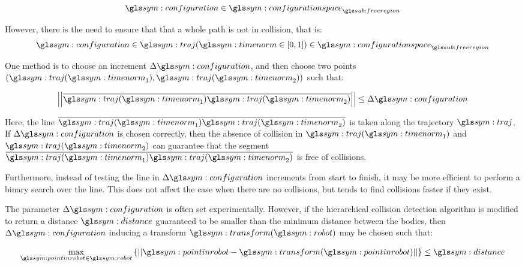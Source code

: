 				\begin{equation}
					\configuration \in \configurationspace_{\freeregion}
				\end{equation}

				However, there is the need to ensure that that a whole path is
				not in collision, that is:
				\begin{equation}
					\configuration \in
						\traj(\timenorm \in [0, 1])
							\in \configurationspace_{\freeregion}
				\end{equation}

				One method is to choose an increment $\Delta\configuration$, and
				then choose two points $(\traj(\timenorm_1),
				\traj(\timenorm_2))$ such that:

				\begin{equation}
					\norm
					{%
						\vecline
						{%
							\traj(\timenorm_1)
						}
						{%
							\traj(\timenorm_2)
						}
					}
					\leq
					\Delta\configuration
				\end{equation}

				Here, the line
				\(
					\vecline
					{%
						\traj(\timenorm_1)
					}
					{%
						\traj(\timenorm_2)
					}
				\)
				is taken along the trajectory $\traj$. If
				$\Delta\configuration$ is chosen correctly, then the absence of
				collision in $\traj(\timenorm_1)$ and $\traj(\timenorm_2)$ can
				guarantee that the segment
				\(
					\vecline
					{%
						\traj(\timenorm_1)
					}
					{%
						\traj(\timenorm_2)
					}
				\)
				is free of collisions.

				Furthermore, instead
				of testing the line in $\Delta\configuration$ increments from
				start to finish, it may be more efficient to perform a binary
				search over the line. This does not affect the case when there
				are no collisions, but tends to find collisions faster if they
				exist.

				The parameter $\Delta\configuration$ is often set
				experimentally. However, if the hierarchical collision detection
				algorithm is modified to return a distance $\distance$
				guaranteed to be smaller than the minimum distance between the
				bodies, then $\Delta\configuration$ inducing a transform
				$\transform(\robot)$ may be chosen such that:

				\begin{equation}
					\max_{\pointinrobot\in\robot}
					\left\{%
						\norm
						{%
							\pointinrobot - \transform(\pointinrobot)
						}
					\right\}
					\leq
					\distance
				\end{equation}

